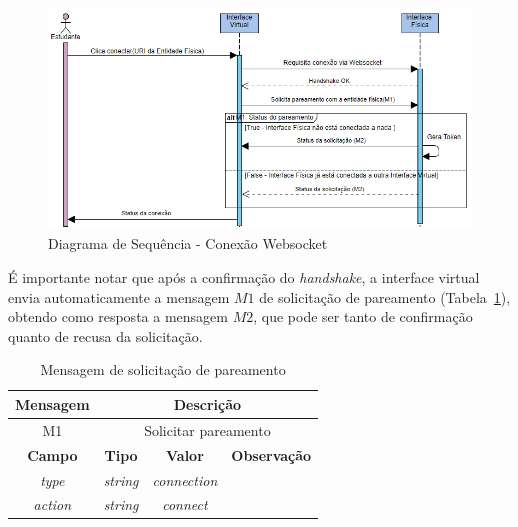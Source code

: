 \begin{figure}[htb]
	\centering
	\includegraphics[width=0.9\linewidth]{chapters/proposedMethod/msg_websocket.png}
	\caption{Diagrama de Sequência - Conexão Websocket}
	\label{fig:diagrama-websockets}
\end{figure}

É importante notar que após a confirmação do \textit{handshake}, a interface virtual envia automaticamente a mensagem $M1$ de solicitação de pareamento (Tabela~\ref{tab:websocket}), obtendo como resposta a mensagem $M2$, que pode ser tanto de confirmação quanto de recusa da solicitação. 

\begin{table}[htb]
	\centering
	\caption{Mensagem de solicitação de pareamento}
	\begin{tabular}{|c|ccc|}
		\hline
		\rowcolor[HTML]{C0C0C0} 
		\textbf{Mensagem} & \multicolumn{3}{c|}{\cellcolor[HTML]{C0C0C0}\textbf{Descrição}} \\ \hline
		M1 & \multicolumn{3}{c|}{Solicitar pareamento} \\ \hline
		\rowcolor[HTML]{C0C0C0} 
		\textbf{Campo} & \multicolumn{1}{c|}{\cellcolor[HTML]{C0C0C0}\textbf{Tipo}} & \multicolumn{1}{c|}{\cellcolor[HTML]{C0C0C0}\textbf{Valor}} & \textbf{Observação} \\ \hline
		\textit{type} & \multicolumn{1}{c|}{\textit{string}} & \multicolumn{1}{c|}{\textit{connection}} & \multicolumn{1}{l|}{} \\ \hline
		\textit{action} & \multicolumn{1}{c|}{\textit{string}} & \multicolumn{1}{c|}{\textit{connect}} & \multicolumn{1}{l|}{} \\ \hline
	\end{tabular}
	\label{tab:websocket}
\end{table}

